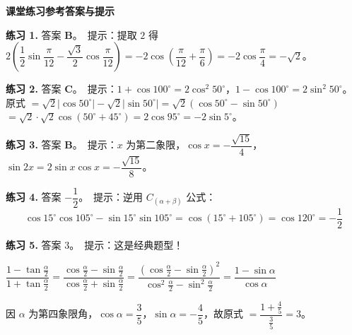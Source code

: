 \documentclass[UTF8,10pt,aspectratio=169]{ctexbeamer}
\begin{document}
	\begin{frame}
		\begin{center}
			{\Large \textbf{课堂练习参考答案与提示}}
		\end{center}
		\vspace{0.3cm}
		
		\textbf{练习 1.} 答案 \textbf{B}。\ 提示：提取 $2$ 得 $2\left(\dfrac{1}{2}\sin\dfrac{\pi}{12} - \dfrac{\sqrt{3}}{2}\cos\dfrac{\pi}{12}\right) = -2\cos\left(\dfrac{\pi}{12}+\dfrac{\pi}{6}\right) = -2\cos\dfrac{\pi}{4} = -\sqrt{2}$。
		
		\pause
		\vspace{0.2cm}
		\textbf{练习 2.} 答案 \textbf{C}。\ 提示：$1+\cos 100^\circ = 2\cos^2 50^\circ$，$1-\cos 100^\circ = 2\sin^2 50^\circ$。
		原式 $= \sqrt{2}|\cos 50^\circ| - \sqrt{2}|\sin 50^\circ| = \sqrt{2}(\cos 50^\circ - \sin 50^\circ)$
		$= \sqrt{2} \cdot \sqrt{2}\cos(50^\circ + 45^\circ) = 2\cos 95^\circ = -2\sin 5^\circ$。
		
		\pause
		\vspace{0.2cm}
		\textbf{练习 3.} 答案 \textbf{B}。\ 提示：$x$ 为第二象限，$\cos x = -\dfrac{\sqrt{15}}{4}$，$\sin 2x = 2\sin x\cos x = -\dfrac{\sqrt{15}}{8}$。
		
		\pause
		\vspace{0.2cm}
		\textbf{练习 4.} 答案 $\boxed{-\dfrac{1}{2}}$。\ 提示：逆用 $C_{(\alpha+\beta)}$ 公式：
		$$\cos 15^\circ\cos 105^\circ - \sin 15^\circ\sin 105^\circ = \cos(15^\circ+105^\circ) = \cos 120^\circ = -\dfrac{1}{2}$$
		
		\pause
		\vspace{0.2cm}
		\textbf{练习 5.} 答案 $\boxed{3}$。\ 提示：这是经典题型！
		
		$\dfrac{1-\tan\frac{\alpha}{2}}{1+\tan\frac{\alpha}{2}} = \dfrac{\cos\frac{\alpha}{2} - \sin\frac{\alpha}{2}}{\cos\frac{\alpha}{2} + \sin\frac{\alpha}{2}} = \dfrac{(\cos\frac{\alpha}{2}-\sin\frac{\alpha}{2})^2}{\cos^2\frac{\alpha}{2}-\sin^2\frac{\alpha}{2}} = \dfrac{1-\sin\alpha}{\cos\alpha}$
		
		\vspace{0.1cm}
		因 $\alpha$ 为第四象限角，$\cos\alpha = \dfrac{3}{5}$，$\sin\alpha = -\dfrac{4}{5}$，故原式 $= \dfrac{1+\frac{4}{5}}{\frac{3}{5}} = 3$。
	\end{frame}
	
\end{document}
